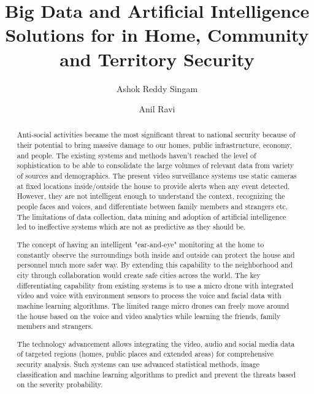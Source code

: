 \documentclass[sigconf]{acmart}
\begin{document}
\title{Big Data and Artificial Intelligence Solutions for in Home, Community and Territory Security}


\author{Ashok Reddy Singam}

\author{Anil Ravi}

\begin{abstract}
Anti-social activities became the most significant threat to national security because of their potential to bring massive damage to our homes, public infrastructure, economy, and people. The existing systems and methods haven't reached the level of sophistication to be able to consolidate the large volumes of relevant data from variety of sources and demographics. The present video surveillance systems use static cameras at fixed locations inside/outside the house to provide alerts when any event detected. However, they are not intelligent enough to understand the context, recognizing the people faces and voices, and differentiate between family members and strangers etc. The limitations of data collection, data mining and adoption of artificial intelligence led to ineffective systems which are not as predictive as they should be.

The concept of having an intelligent "ear-and-eye" monitoring at the home to constantly observe the surroundings both inside and outside can protect the house and personnel much more safer way. By extending this capability to the neighborhood and city through collaboration would create safe cities across the world. 
The key differentiating capability from existing systems is to use a micro drone with integrated video and voice with environment sensors to process the voice and facial data with machine learning algorithms. The limited range micro drones can freely move around the house based on the voice and video analytics while learning the friends, family members and strangers. 

The technology advancement allows integrating the video, audio and social media data of targeted regions (homes, public places and extended areas) for comprehensive security analysis. Such systems can use advanced statistical methods, image classification and machine learning algorithms to predict and prevent the threats based on the severity probability.

\end{abstract}
\end{document}
